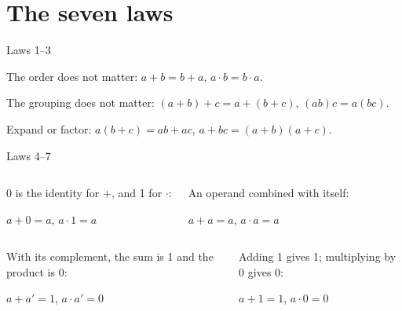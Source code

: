 \documentclass[10pt]{wosm-slides}
\begin{document}
\section{The seven laws}

\begin{frame}{Laws 1--3}
  \begin{definition}[Commutativity]
    The order does not matter:
    \quad $a + b = b + a$, \quad $a \cdot b = b \cdot a$.
  \end{definition}

  \begin{definition}[Associativity]
    The grouping does not matter:
    \quad $(a + b) + c = a + (b + c)$, \quad $(ab)c = a(bc)$.
  \end{definition}

  \begin{definition}[Distributivity]
    Expand or factor:
    \quad $a(b + c) = ab + ac$, \quad $a + bc = (a + b)(a + c)$.
  \end{definition}
\end{frame}

\begin{frame}{Laws 4--7}
  \begin{columns}[T, totalwidth=\textwidth]
      \begin{definition}[Identity]
        0 is the identity for $+$, and 1 for $\cdot$:\par
        \centering $a + 0 = a$, \quad $a \cdot 1 = a$
      \end{definition}
      \begin{definition}[Idempotence]
        An operand combined with itself:\par
        \centering $a + a = a$, \quad $a \cdot a = a$
      \end{definition}
  \end{columns}

  \begin{columns}[T, totalwidth=\textwidth]
      \begin{definition}[Complement]
        With its complement, the sum is 1 and the product is 0:\par
        \centering $a + a' = 1$, \quad $a \cdot a' = 0$
      \end{definition}
      \begin{definition}[Domination]
        Adding 1 gives 1; multiplying by 0 gives 0:\par
        \centering $a + 1 = 1$, \quad $a \cdot 0 = 0$
      \end{definition}
  \end{columns}
\end{frame}
\end{document}
